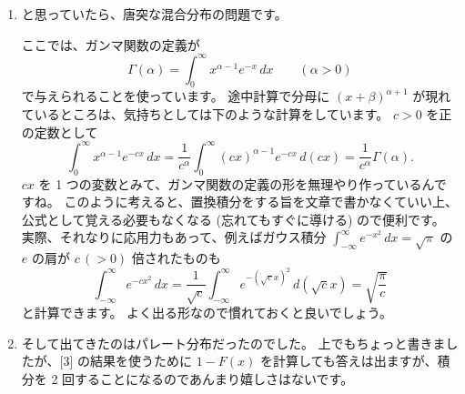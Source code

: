 \documentclass[./main.tex]{subfiles}
\begin{document}
\begin{enumerate}
        \item と思っていたら、唐突な混合分布の問題です。

        ここでは、ガンマ関数の定義が
        \begin{equation}
            \Gamma (\alpha) 
                = \int_0^\infty x^{\alpha - 1} e^{-x} \, dx
                \qquad (\alpha > 0)
        \end{equation}
        で与えられることを使っています。
        途中計算で分母に $(x + \beta)^{\alpha + 1}$ が現れているところは、気持ちとしては下のような計算をしています。
        $c > 0$ を正の定数として
        \begin{equation*}
            \int_0^\infty x^{\alpha - 1} e^{-cx} \, dx
                = \frac{1}{c^\alpha} \int_0^\infty (cx)^{\alpha - 1} e^{-cx} \, d(cx)
                = \frac{1}{c^\alpha} \Gamma (\alpha).
        \end{equation*}
        $cx$ を 1 つの変数とみて、ガンマ関数の定義の形を無理やり作っているんですね。
        このように考えると、置換積分をする旨を文章で書かなくていい上、公式として覚える必要もなくなる (忘れてもすぐに導ける) ので便利です。
        実際、それなりに応用力もあって、例えばガウス積分 $\displaystyle \int_{-\infty}^\infty e^{-x^2} \, dx = \sqrt{\pi}$ の $e$ の肩が $c \,(> 0)$ 倍されたものも
        \begin{equation*}
            \int_{-\infty}^\infty e^{-cx^2} \, dx
                = \frac{1}{\sqrt{c}} \int_{-\infty}^\infty e^{-(\sqrt{c} x )^2} \, d(\sqrt{c}x)
                = \sqrt{ \frac{\pi}{c}}
        \end{equation*}
        と計算できます。
        よく出る形なので慣れておくと良いでしょう。


        \item そして出てきたのはパレート分布だったのでした。
        上でもちょっと書きましたが、[3] の結果を使うために $1 - F (x)$ を計算しても答えは出ますが、積分を 2 回することになるのであんまり嬉しさはないです。

        
    \end{enumerate}
\end{document}
